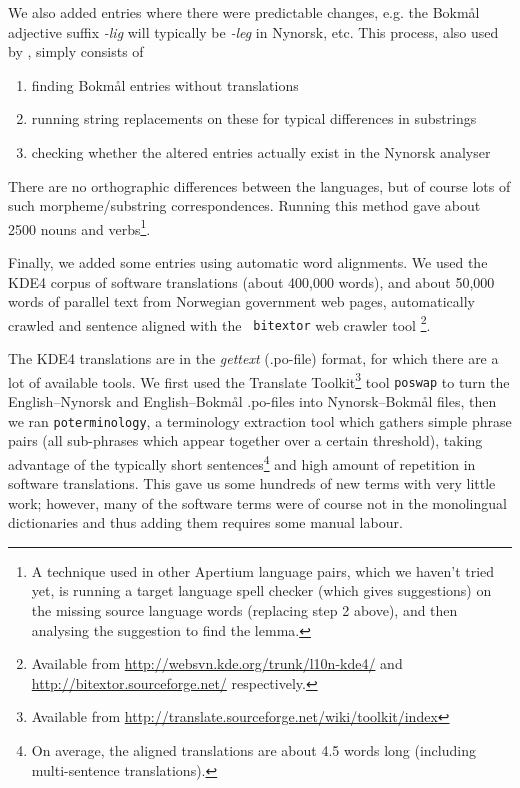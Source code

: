 \documentclass[11pt]{article}
\begin{document}
We also added entries where there were predictable changes, e.g. the
Bokmål adjective suffix \emph{-lig} will typically be \emph{-leg} in Nynorsk,
etc. This process, also used by \citet[p.~4]{tyers2009dpm},
simply consists of
\begin{enumerate}
\item finding Bokmål entries without translations
\item running string replacements on these for typical differences in
   substrings
\item checking whether the altered entries actually exist in the Nynorsk
   analyser
\end{enumerate}
There are no orthographic differences between the languages, but of
course lots of such morpheme/substring correspondences. Running
 this method gave about 2500 nouns and verbs\footnote{A technique
  used in other Apertium language pairs, which we haven't tried yet,
  is running a target language spell checker (which gives suggestions)
  on the missing source language words (replacing step 2 above), and
  then analysing the suggestion to find the lemma. }.

Finally, we added some entries using automatic word alignments. We
used the KDE4 corpus of software translations (about 400,000 words),
and about 50,000 words of parallel text from Norwegian government web
pages, automatically crawled and sentence aligned with the {\tt \small
  bitextor} web crawler tool
\citep{espla-gomis2009bfs}\footnote{Available from
  \href{http://websvn.kde.org/trunk/l10n-kde4/}{http://websvn.kde.org/trunk/l10n-kde4/}
  and
  \href{http://bitextor.sourceforge.net/}{http://bitextor.sourceforge.net/}
  respectively.}.

The KDE4 translations are in the \emph{gettext} (.po-file) format, for
which there are a lot of available tools. We first used the Translate
Toolkit\footnote{Available from
  \href{http://translate.sourceforge.net/wiki/toolkit/index}{http://translate.sourceforge.net/wiki/toolkit/index}
} tool {\tt \small  poswap} to turn the English–Nynorsk and English–Bokmål
.po-files into Nynorsk–Bokmål files, then we ran
{\tt \small  poterminology}, a terminology extraction tool which gathers
simple phrase pairs (all sub-phrases which appear together over a
certain threshold), taking advantage of the typically short
sentences\footnote{On average, the aligned translations are about 4.5
  words long (including multi-sentence translations).} and high amount
of repetition in software translations. This gave us some hundreds of
new terms with very little work; however, many of the software terms
were of course not in the monolingual dictionaries and thus adding
them requires some manual labour.
\end{document}
